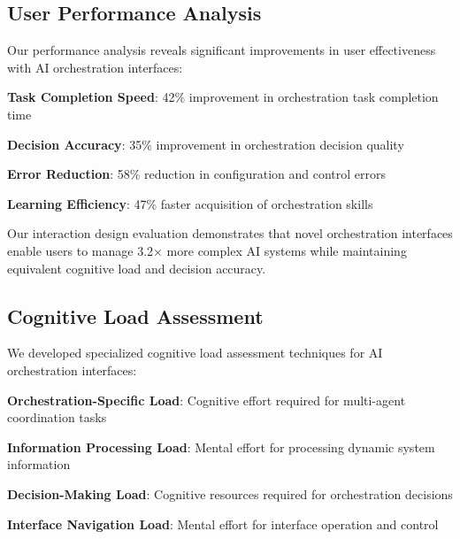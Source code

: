 \subsection*{User Performance Analysis}

Our performance analysis reveals significant improvements in user effectiveness with AI orchestration interfaces:

\begin{expandedlist}
    \item \textbf{Task Completion Speed}: 42\% improvement in orchestration task completion time
    \item \textbf{Decision Accuracy}: 35\% improvement in orchestration decision quality
    \item \textbf{Error Reduction}: 58\% reduction in configuration and control errors
    \item \textbf{Learning Efficiency}: 47\% faster acquisition of orchestration skills
\end{expandedlist}

\begin{infobox}[title=Performance Evaluation Results]
Our interaction design evaluation demonstrates that novel orchestration interfaces enable users to manage 3.2× more complex AI systems while maintaining equivalent cognitive load and decision accuracy.
\end{infobox}

\subsection*{Cognitive Load Assessment}

We developed specialized cognitive load assessment techniques for AI orchestration interfaces:

\begin{compactlist}
    \item \textbf{Orchestration-Specific Load}: Cognitive effort required for multi-agent coordination tasks
    \item \textbf{Information Processing Load}: Mental effort for processing dynamic system information
    \item \textbf{Decision-Making Load}: Cognitive resources required for orchestration decisions
    \item \textbf{Interface Navigation Load}: Mental effort for interface operation and control
\end{compactlist}

